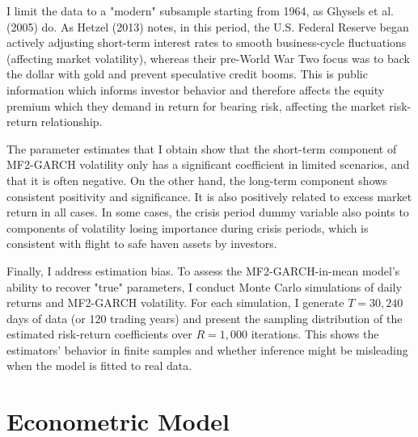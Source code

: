 \documentclass[12pt]{article}
\begin{document}
I limit the data to a "modern" subsample starting from 1964, as Ghysels et al. (2005) do. As Hetzel (2013) notes, in this period, the U.S. Federal Reserve began actively adjusting short-term interest rates to smooth business-cycle fluctuations (affecting market volatility), whereas their pre-World War Two focus was to back the dollar with gold and prevent speculative credit booms. This is public information which informs investor behavior and therefore affects the equity premium which they demand in return for bearing risk, affecting the market risk-return relationship.\par
The parameter estimates that I obtain show that the short-term component of MF2-GARCH volatility only has a significant coefficient in limited scenarios, and that it is often negative. On the other hand, the long-term component shows consistent positivity and significance. It is also positively related to excess market return in all cases. In some cases, the crisis period dummy variable also points to components of volatility losing importance during crisis periods, which is consistent with flight to safe haven assets by investors.\par
Finally, I address estimation bias. To assess the MF2-GARCH-in-mean model's ability to recover "true" parameters, I conduct Monte Carlo simulations of daily returns and MF2-GARCH volatility. For each simulation, I generate $T=30,240$ days of data (or 120 trading years) and present the sampling distribution of the estimated risk-return coefficients over $R=1,000$ iterations. This shows the estimators' behavior in finite samples and whether inference might be misleading when the model is fitted to real data.\par


\section{Econometric Model}
\end{document}
